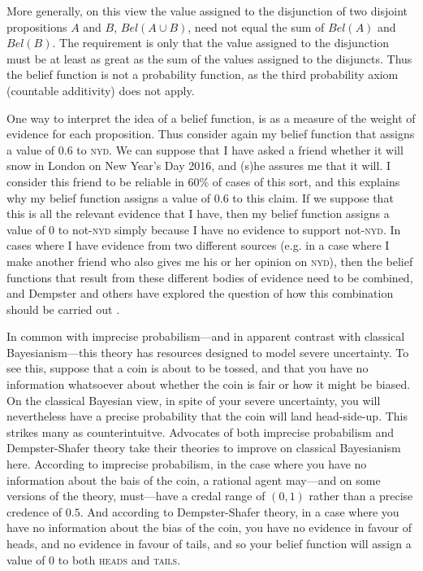More generally, on this view the value assigned to the disjunction of two disjoint propositions $A$ and $B$, $Bel(A \cup B)$, need not equal the sum of $Bel(A)$ and $Bel(B)$. The requirement is only that the value assigned to the disjunction must be at least as great as the sum of the values assigned to the disjuncts. Thus the belief function is not a probability function, as the third probability axiom (countable additivity) does not apply.

One way to interpret the idea of a belief function, is as a measure of the weight of evidence for each proposition. Thus consider again my belief function that assigns a value of $0.6$ to \textsc{nyd}. We can suppose that I have asked a friend whether it will snow in London on New Year's Day 2016, and (s)he assures me that it will. I consider this friend to be reliable in $60\%$ of cases of this sort, and this explains why my belief function assigns a value of $0.6$ to this claim. If we suppose that this is all the relevant evidence that I have, then my belief function assigns a value of $0$ to not-\textsc{nyd} simply because I have no evidence to support not-\textsc{nyd}. In cases where I have evidence from two different sources (e.g. in a case where I make another friend who also gives me his or her opinion on \textsc{nyd}), then the belief functions that result from these different bodies of evidence need to be combined, and Dempster and others have explored the question of how this combination should be carried out \citep{dempster1967}.

In common with imprecise probabilism---and in apparent contrast with classical Bayesianism---this theory has resources designed to model severe uncertainty. To see this, suppose that a coin is about to be tossed, and that you have no information whatsoever about whether the coin is fair or how it might be biased. On the classical Bayesian view, in spite of your severe uncertainty, you will nevertheless have a precise probability that the coin will land head-side-up. This strikes many as counterintuitve. Advocates of both imprecise probabilism and Dempster-Shafer theory take their theories to improve on classical Bayesianism here. According to imprecise probabilism, in the case where you have no information about the bais of the coin, a rational agent may---and on some versions of the theory, must---have a credal range of $(0,1)$ rather than a precise credence of $0.5$. And according to Dempster-Shafer theory, in a case where you have no information about the bias of the coin, you have no evidence in favour of heads, and no evidence in favour of tails, and so your belief function will assign a value of $0$ to both \textsc{heads} and \textsc{tails}. 

